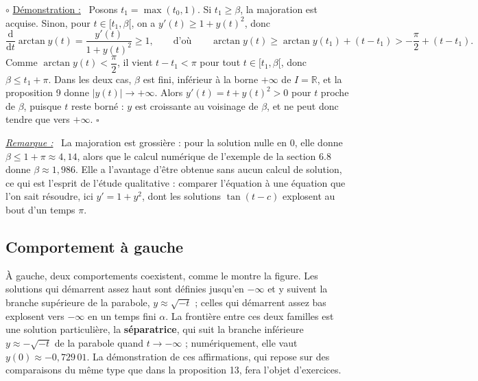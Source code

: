 \documentclass[a4paper,twoside]{report}
\newcommand{\mot}[1]{\textcolor{rougecours}{\textbf{#1}}}
\newenvironment{demo}%
 {\par\needspace{4\baselineskip}\vspace{1mm}\noindent$\circ$ \underline{Démonstration :}~\setlength{\parskip}{3pt plus 1pt}}%
 {\hfill$\square$\par\vspace{2mm}}
\newenvironment{remarque}%
 {\par\needspace{6\baselineskip}\vspace{1mm}\begin{list}{}{\leftmargin=1cm \rightmargin=0.5cm}\item[]%
  \textit{\underline{Remarque :}}~}%
 {\end{list}\vspace{1mm}}
\newcommand{\R}{\mathbb{R}}
\newcommand{\dd}{\mathrm{d}}                      %
\begin{document}
\begin{demo}
Posons $t_{1} = \max(t_{0}, 1)$. Si $t_{1} \geqslant \beta$, la majoration est acquise. Sinon, pour $t \in [t_{1}, \beta[$, on a $y'(t) \geqslant 1 + y(t)^{2}$, donc
\[ \frac{\dd}{\dd t}\arctan y(t) = \frac{y'(t)}{1 + y(t)^{2}} \geqslant 1, \qquad \text{d'où} \qquad \arctan y(t) \geqslant \arctan y(t_{1}) + (t - t_{1}) > -\frac{\pi}{2} + (t - t_{1}). \]
Comme $\arctan y(t) < \dfrac{\pi}{2}$, il vient $t - t_{1} < \pi$ pour tout $t \in [t_{1}, \beta[$, donc $\beta \leqslant t_{1} + \pi$. Dans les deux cas, $\beta$ est fini, inférieur à la borne $+\infty$ de $I = \R$, et la proposition 9 donne $|y(t)| \to +\infty$. Alors $y'(t) = t + y(t)^{2} > 0$ pour $t$ proche de $\beta$, puisque $t$ reste borné : $y$ est croissante au voisinage de $\beta$, et ne peut donc tendre que vers $+\infty$.
\end{demo}

\begin{remarque}
La majoration est grossière : pour la solution nulle en $0$, elle donne $\beta \leqslant 1 + \pi \approx 4{,}14$, alors que le calcul numérique de l'exemple de la section 6.8 donne $\beta \approx 1{,}986$. Elle a l'avantage d'être obtenue sans aucun calcul de solution, ce qui est l'esprit de l'étude qualitative : comparer l'équation à une équation que l'on sait résoudre, ici $y' = 1 + y^{2}$, dont les solutions $\tan(t - c)$ explosent au bout d'un temps $\pi$.
\end{remarque}

\subsection{Comportement à gauche}

À gauche, deux comportements coexistent, comme le montre la figure. Les solutions qui démarrent assez haut sont définies jusqu'en $-\infty$ et y suivent la branche supérieure de la parabole, $y \approx \sqrt{-t}$ ; celles qui démarrent assez bas explosent vers $-\infty$ en un temps fini $\alpha$. La frontière entre ces deux familles est une solution particulière, la \mot{séparatrice}, qui suit la branche inférieure $y \approx -\sqrt{-t}$ de la parabole quand $t \to -\infty$ ; numériquement, elle vaut $y(0) \approx -0{,}729\,01$. La démonstration de ces affirmations, qui repose sur des comparaisons du même type que dans la proposition 13, fera l'objet d'exercices.
\end{document}
